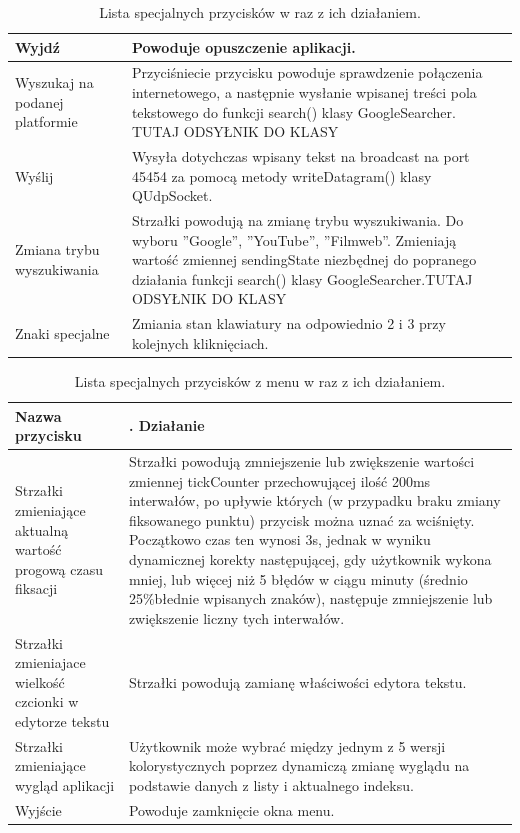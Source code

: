 \documentclass[twoside,a4paper]{book}
\begin{document}
\begin{table}
\begin{tabular}{|p{4cm}|p{8.5cm}|}
     Wyjdź & Powoduje opuszczenie aplikacji.\\ \hline 
      Wyszukaj na podanej platformie & Przyciśniecie przycisku powoduje sprawdzenie połączenia internetowego, a następnie wysłanie wpisanej treści pola tekstowego do funkcji search() klasy GoogleSearcher. TUTAJ ODSYŁNIK DO KLASY\\ \hline
        Wyślij & Wysyła dotychczas wpisany tekst na broadcast na port 45454 za pomocą metody writeDatagram() klasy QUdpSocket.\\ \hline
    Zmiana trybu wyszukiwania & Strzałki powodują na zmianę trybu wyszukiwania. Do wyboru ''Google'', ''YouTube'', ''Filmweb''. Zmieniają wartość zmiennej sendingState niezbędnej do popranego działania funkcji  search() klasy GoogleSearcher.TUTAJ ODSYŁNIK DO KLASY\\ \hline 
    Znaki specjalne & Zmiania stan klawiatury na odpowiednio 2 i 3 przy kolejnych kliknięciach. \\ \hline
       \end{tabular}
    \caption{Lista specjalnych przycisków w raz z ich działaniem.} 
    \label{table:specialButtons}
\end{table}

\begin{table}
    \begin{tabular}{|p{4cm}|p{8.5cm}|}
        \hline
    \textbf{Nazwa przycisku} &. \textbf{Działanie}\\ \hline
       Strzałki zmieniające aktualną wartość progową czasu fiksacji & Strzałki powodują zmniejszenie lub zwiększenie wartości zmiennej tickCounter przechowującej ilość 200ms interwałów, po upływie których (w przypadku braku zmiany fiksowanego punktu) przycisk można uznać za wciśnięty. Początkowo czas ten wynosi 3s, jednak w wyniku dynamicznej korekty następującej, gdy użytkownik wykona mniej, lub więcej niż 5 błędów w ciągu minuty (średnio 25\%błednie wpisanych znaków), następuje zmniejszenie lub zwiększenie liczny tych interwałów. \\ \hline  
       Strzałki zmieniajace wielkość czcionki w edytorze tekstu & Strzałki powodują zamianę właściwości edytora tekstu. \\ \hline
       Strzałki zmieniające wygląd aplikacji & Użytkownik może wybrać między jednym z 5 wersji kolorystycznych poprzez dynamiczą zmianę wyglądu na podstawie danych z listy i aktualnego indeksu.  \\ \hline    
       Wyjście & Powoduje zamknięcie okna menu. \\ \hline
    \end{tabular}
    \caption{Lista specjalnych przycisków z menu w raz z ich działaniem.} 
    \label{table:specialButtonsMenu}
\end{table}
\end{document}
